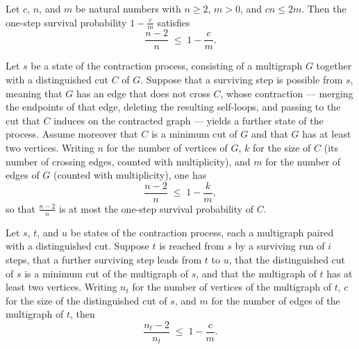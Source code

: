 \begin{lemma}
\label{KargerTrace.survivalProb_ge_factor}
\leanok
{}
Let $c$, $n$, and $m$ be natural numbers with $n \ge 2$, $m > 0$, and $cn \le 2m$. Then
the one-step survival probability $1 - \frac{c}{m}$ satisfies
\[
  \frac{n-2}{n} \;\le\; 1 - \frac{c}{m}.
\]
\end{lemma}

\begin{lemma}
\label{KargerTrace.survivingStep_survivalProb_ge_factor}
\leanok
{}
Let $s$ be a state of the contraction process, consisting of a multigraph $G$ together
with a distinguished cut $C$ of $G$. Suppose that a surviving step is possible from $s$,
meaning that $G$ has an edge that does not cross $C$, whose contraction — merging the
endpoints of that edge, deleting the resulting self-loops, and passing to the cut that
$C$ induces on the contracted graph — yields a further state of the process. Assume
moreover that $C$ is a minimum cut of $G$ and that $G$ has at least two vertices.
Writing $n$ for the number of vertices of $G$, $k$ for the size of $C$ (its number of
crossing edges, counted with multiplicity), and $m$ for the number of edges of $G$
(counted with multiplicity), one has
\[
  \frac{n-2}{n} \;\le\; 1 - \frac{k}{m},
\]
so that $\frac{n-2}{n}$ is at most the one-step survival probability of $C$.
\end{lemma}

\begin{lemma}
\label{KargerTrace.survivingRun_survivalProb_ge_factor}
\leanok
{}
Let $s$, $t$, and $u$ be states of the contraction process, each a multigraph paired
with a distinguished cut. Suppose $t$ is reached from $s$ by a surviving run of $i$
steps, that a further surviving step leads from $t$ to $u$, that the distinguished cut
of $s$ is a minimum cut of the multigraph of $s$, and that the multigraph of $t$ has at
least two vertices. Writing $n_t$ for the number of vertices of the multigraph of $t$,
$c$ for the size of the distinguished cut of $s$, and $m$ for the number of edges of the
multigraph of $t$, then
\[
  \frac{n_t - 2}{n_t} \;\le\; 1 - \frac{c}{m}.
\]
\end{lemma}

